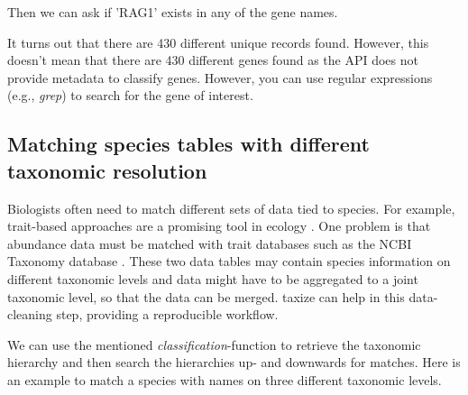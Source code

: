 \documentclass[10pt,a4paper,twocolumn]{article}
\makeatletter
\newcommand{\hlfunctioncall}[1]{\textcolor[rgb]{0.501960784313725,0,0.329411764705882}{\textbf{#1}}}%
\newcommand{\hlstring}[1]{\textcolor[rgb]{0.6,0.6,1}{#1}}%
\newenvironment{kframe}{%
 \def\at@end@of@kframe{}%
 \ifinner\ifhmode%
  \def\at@end@of@kframe{\end{minipage}}%
  \begin{minipage}{\columnwidth}%
 \fi\fi%
 \def\FrameCommand##1{\hskip\@totalleftmargin \hskip-\fboxsep
 \colorbox{shadecolor}{##1}\hskip-\fboxsep
     \hskip-\linewidth \hskip-\@totalleftmargin \hskip\columnwidth}%
 \MakeFramed {\advance\hsize-\width
   \@totalleftmargin\z@ \linewidth\hsize
   \@setminipage}}%
 {\par\unskip\endMakeFramed%
 \at@end@of@kframe}
\newenvironment{knitrout}{}{} %
\makeatother
\begin{document}
Then we can ask if 'RAG1' exists in any of the gene names.

\begin{knitrout}
\end{knitrout}


It turns out that there are 430 different unique records found. However, this doesn't mean that there are 430 different genes found as the API does not provide metadata to classify genes. However, you can use regular expressions (e.g., \emph{grep}) to search for the gene of interest.


\subsection*{Matching species tables with different taxonomic resolution}

Biologists often need to match different sets of data tied to species. For example, trait-based approaches are a promising tool in ecology \cite{statzner_can_2010}. One problem is that abundance data must be matched with trait databases such as the NCBI Taxonomy database \cite{usseglio-polatera_biological_2000}. These two data tables may contain species information on different taxonomic levels and data might have to be aggregated to a joint taxonomic level, so that the data can be merged. taxize can help in this data-cleaning step, providing a reproducible workflow.

We can use the mentioned \emph{classification}-function to retrieve the taxonomic hierarchy and then search the hierarchies up- and downwards for matches. Here is an example to match a species with names on three different taxonomic levels.
\end{document}
